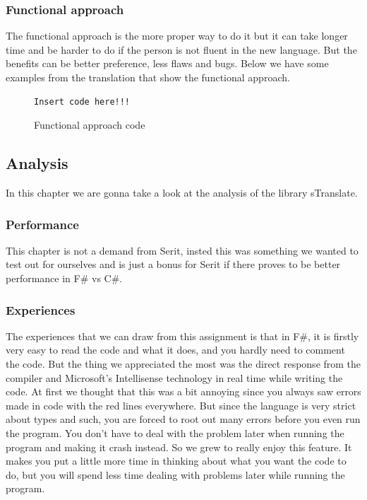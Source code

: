 \documentclass[12pt, a4paper]{article}
\begin{document}
\newpage


\subsubsection{Functional approach}
The functional approach is the more proper way to do it but it can take longer time and be harder to do if the person is not fluent in the new language. But the benefits can be better preference, less flaws and bugs. Below we have some examples from the translation that show the functional approach.

\begin{figure}[!h]
\begin{lstlisting}
Insert code here!!!
\end{lstlisting}
\caption{Functional approach code}
\end{figure}

\newpage

\subsection{Analysis}
In this chapter we are gonna take a look at the analysis of the library sTranslate.
\subsubsection{Performance}
This chapter is not a demand from Serit, insted this was something we wanted to test out for ourselves and is just a bonus for Serit if there proves to be better performance in F\# vs C\#.
\subsubsection{Experiences}
The experiences that we can draw from this assignment is that in F\#, it is firstly very easy to read the code and what it does, and you hardly need to comment the code. But the thing we appreciated the most was the direct response from the compiler and Microsoft’s Intellisense technology in real time while writing the code. At first we thought that this was a bit annoying since you always saw errors made in code with the red lines everywhere. But since the language is very strict about types and such, you are forced to root out many errors before you even run the program. You don't have to deal with the problem later when running the program and making it crash instead. So we grew to really enjoy this feature. It makes you put a little more time in thinking about what you want the code to do, but you will spend less time dealing with problems later while running the program.\\
\end{document}
